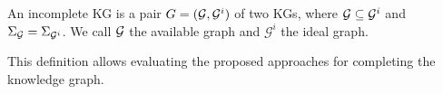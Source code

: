 


\begin{definition} An incomplete KG is a pair
    $G = (\mathcal{G}, \mathcal{G}^i)$ of two KGs, where $\mathcal{G}\subseteq \mathcal{G}^i$ and
    $\Sigma_{\mathcal{G}}=\Sigma_{\mathcal{G}^i}$. We call $\mathcal{G}$ the available
    graph and $\mathcal{G}^i$ the ideal graph.  \end{definition}
    
This definition allows evaluating the proposed approaches for completing the knowledge graph.  


